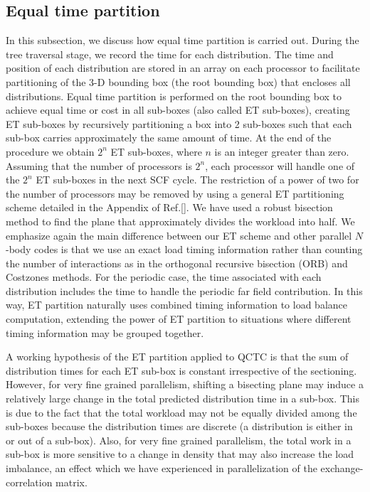 \commentoutA{\documentclass[prl,aps,twocolumn,twocolumngrid,superbib]{revtex4}}
\begin{document}
\subsection{Equal time partition}
\label{sec:ETPartition}
In this subsection, we discuss how equal time partition is carried out.
During the tree traversal stage, we record the time for each 
distribution. The time and position of each distribution are
stored in an array on each processor to facilitate partitioning of the
3-D bounding box (the root bounding box) that encloses all
distributions. Equal time partition\cite{CGan03} is performed on the
root bounding box to achieve equal time or cost in all sub-boxes (also
called ET sub-boxes),  creating ET sub-boxes by
recursively partitioning a box into 2 sub-boxes such that each sub-box
carries approximately the same amount of time. At the end of the
procedure we obtain $2^n$ ET sub-boxes, where $n$ is an integer
greater than zero.  Assuming that the number of processors is $2^n$,
each processor will handle one of the $2^n$ ET sub-boxes in the next
SCF cycle.  The restriction of a power of two for the number of
processors may be removed by using a general ET partitioning scheme
detailed in the Appendix of Ref.[].  We have used a
robust bisection method\cite{WPress92} to find the plane that
approximately divides the workload into half.  We emphasize again the
main difference between our ET scheme and other parallel $N$-body
codes\cite{MWarren92,Singh93} is that we use an exact load timing
information rather than counting the number of interactions as in the
orthogonal recursive bisection (ORB)\cite{MWarren92} and Costzones
methods.\cite{Singh93}
For the periodic case, the time associated with each distribution
includes the time to handle the periodic far
field\cite{MChallacombe97D,CTymczak04a} contribution. In this way, ET
partition naturally uses combined timing information to load balance
computation, extending the power of ET partition to situations where
different timing information may be grouped together.

A working hypothesis of the ET partition applied to QCTC is that the
sum of distribution times for each ET sub-box is constant irrespective
of the sectioning. However, for very fine grained parallelism,
shifting a bisecting plane may induce a relatively large change in the
total predicted distribution time in a sub-box. This is due to the
fact that the total workload may not be equally divided among the
sub-boxes because the distribution times are discrete (a distribution
is either in or out of a sub-box).  Also, for very fine
grained parallelism, the total work in a sub-box is more sensitive to
a change in density that may also increase the load imbalance, an
effect which we have experienced in parallelization of the
exchange-correlation matrix\cite{CGan03}.
\end{document}
